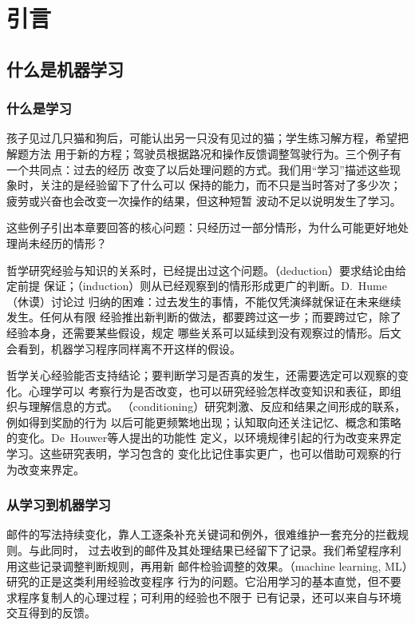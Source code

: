\chapter{引言}
\label{chap:introduction}

\section{什么是机器学习}
\label{sec:what-is-machine-learning}

\subsection{什么是学习}

孩子见过几只猫和狗后，可能认出另一只没有见过的猫；学生练习解方程，希望把解题方法
用于新的方程；驾驶员根据路况和操作反馈调整驾驶行为。三个例子有一个共同点：过去的经历
改变了以后处理问题的方式。我们用“学习”描述这些现象时，关注的是经验留下了什么可以
保持的能力，而不只是当时答对了多少次；疲劳或兴奋也会改变一次操作的结果，但这种短暂
波动不足以说明发生了学习。

这些例子引出本章要回答的核心问题：只经历过一部分情形，为什么可能更好地处理尚未经历的情形？

哲学研究经验与知识的关系时，已经提出过这个问题。（deduction）要求结论由给定前提
保证；（induction）则从已经观察到的情形形成更广的判断。D.~Hume（休谟）讨论过
归纳的困难：过去发生的事情，不能仅凭演绎就保证在未来继续发生。任何从有限
经验推出新判断的做法，都要跨过这一步；而要跨过它，除了经验本身，还需要某些假设，规定
哪些关系可以延续到没有观察过的情形。后文会看到，机器学习程序同样离不开这样的假设。

哲学关心经验能否支持结论；要判断学习是否真的发生，还需要选定可以观察的变化。心理学可以
考察行为是否改变，也可以研究经验怎样改变知识和表征，即组织与理解信息的方式。
（conditioning）研究刺激、反应和结果之间形成的联系，例如得到奖励的行为
以后可能更频繁地出现；认知取向还关注记忆、概念和策略的变化。De~Houwer等人提出的功能性
定义，以环境规律引起的行为改变来界定学习。这些研究表明，学习包含的
变化比记住事实更广，也可以借助可观察的行为改变来界定。

\subsection{从学习到机器学习}
邮件的写法持续变化，靠人工逐条补充关键词和例外，很难维护一套充分的拦截规则。与此同时，
过去收到的邮件及其处理结果已经留下了记录。我们希望程序利用这些记录调整判断规则，再用新
邮件检验调整的效果。（machine learning, ML）研究的正是这类利用经验改变程序
行为的问题。它沿用学习的基本直觉，但不要求程序复制人的心理过程；可利用的经验也不限于
已有记录，还可以来自与环境交互得到的反馈。

